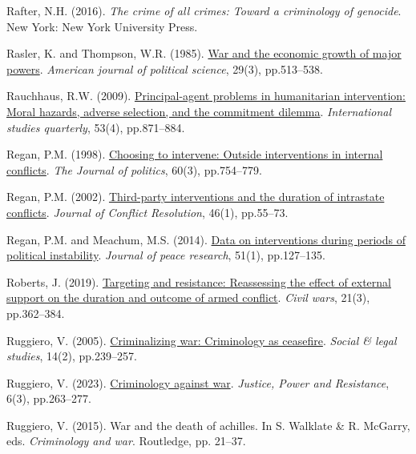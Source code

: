 \documentclass[
]{article}
\newlength{\cslhangindent}
\newenvironment{CSLReferences}[2] %
 {\begin{list}{}{%
  \setlength{\itemindent}{0pt}
  \setlength{\leftmargin}{0pt}
  \setlength{\parsep}{0pt}
  \ifodd #1
   \setlength{\leftmargin}{\cslhangindent}
   \setlength{\itemindent}{-1\cslhangindent}
  \fi
  \setlength{\itemsep}{#2\baselineskip}}}
 {\end{list}}
\begin{document}
\begin{CSLReferences}{0}{1}
Rafter, N.H. (2016). \emph{The crime of all crimes: Toward a criminology
of genocide}. New York: New York University Press.

Rasler, K. and Thompson, W.R. (1985).
\href{https://doi.org/10.2307/2111141}{War and the economic growth of
major powers}. \emph{American journal of political science}, 29(3),
pp.513--538.

Rauchhaus, R.W. (2009).
\href{https://doi.org/10.1111/j.1468-2478.2009.00560.x}{Principal-agent
problems in humanitarian intervention: Moral hazards, adverse selection,
and the commitment dilemma}. \emph{International studies quarterly},
53(4), pp.871--884.

Regan, P.M. (1998). \href{https://doi.org/10.2307/2647647}{Choosing to
intervene: Outside interventions in internal conflicts}. \emph{The
Journal of politics}, 60(3), pp.754--779.

Regan, P.M. (2002).
\href{https://doi.org/10.1177/0022002702046001004}{Third-party
interventions and the duration of intrastate conflicts}. \emph{Journal
of Conflict Resolution}, 46(1), pp.55--73.

Regan, P.M. and Meachum, M.S. (2014).
\href{https://doi.org/10.1177/0022343313505303}{Data on interventions
during periods of political instability}. \emph{Journal of peace
research}, 51(1), pp.127--135.

Roberts, J. (2019).
\href{https://doi.org/10.1080/13698249.2019.1648631}{Targeting and
resistance: Reassessing the effect of external support on the duration
and outcome of armed conflict}. \emph{Civil wars}, 21(3), pp.362--384.

Ruggiero, V. (2005).
\href{https://doi.org/10.1177/0964663905051221}{Criminalizing war:
Criminology as ceasefire}. \emph{Social \& legal studies}, 14(2),
pp.239--257.

Ruggiero, V. (2023). \href{https://doi.org/10.1332/TGBW8348}{Criminology
against war}. \emph{Justice, Power and Resistance}, 6(3), pp.263--277.

Ruggiero, V. (2015). War and the death of achilles. In S. Walklate \& R.
McGarry, eds. \emph{Criminology and war}. Routledge, pp. 21--37.


\end{CSLReferences}
\end{document}
